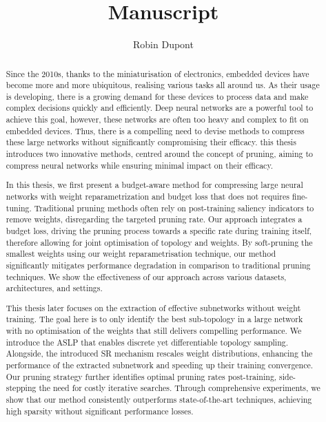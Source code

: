 \title{\vspace{-3.0cm}Manuscript}
\author{Robin Dupont}
\date{}

\newpage

\begin{abstract}

    Since the 2010s, thanks to the miniaturisation of electronics,
    embedded devices have become more and more ubiquitous, realising various
    tasks all around us. As their usage is developing, there is a growing demand
    for these devices to process data and make complex decisions quickly and
    efficiently. Deep neural networks are a powerful tool to achieve this goal,
    however, these networks are often too heavy and complex to fit on embedded
    devices. Thus, there is a compelling need to devise methods to compress
    these large networks without significantly compromising their efficacy. this
    thesis introduces two innovative methods, centred around the concept of
    pruning, aiming to compress neural networks while ensuring minimal impact on
    their efficacy.

    In this thesis, we first present a budget-aware method for compressing large
    neural networks with weight reparametrization and budget loss that does not
    requires fine-tuning. Traditional pruning methods often rely on
    post-training saliency indicators to remove weights, disregarding the
    targeted pruning rate. Our approach integrates a budget loss, driving the
    pruning process towards a specific rate during training itself, therefore
    allowing for joint optimisation of topology and weights. By soft-pruning the
    smallest weights using our weight reparametrisation technique, our method
    significantly mitigates performance degradation in comparison to traditional
    pruning techniques. We show the effectiveness of our approach across various
    datasets, architectures, and settings.

    This thesis later focuses on the extraction of effective subnetworks without
    weight training. The goal here is to only identify the best sub-topology in
    a large network with no optimisation of the weights that still delivers
    compelling performance. We introduce the \acl{ASLP} that enables discrete
    yet differentiable topology sampling. Alongside, the introduced \acl{SR}
    mechanism rescales weight distributions, enhancing the performance of the
    extracted subnetwork and speeding up their training convergence. Our pruning
    strategy further identifies optimal pruning rates post-training,
    side-stepping the need for costly iterative searches. Through comprehensive
    experiments, we show that our method consistently outperforms
    state-of-the-art techniques, achieving high sparsity without significant
    performance losses.

\end{abstract}
